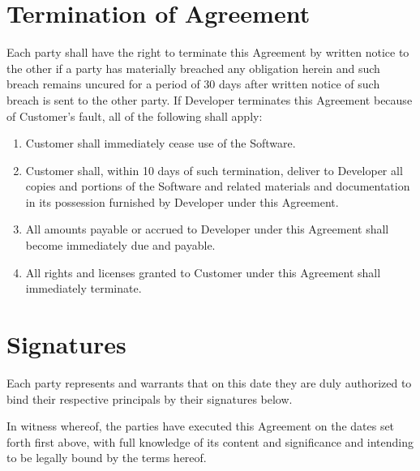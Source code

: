 \documentclass[11pt]{article}
\begin{document}
\section{Termination of Agreement}
Each party shall have the right to terminate this Agreement by written notice to the other if a party has materially breached any obligation herein and such breach remains uncured for a period of 30 days after written notice of such breach is sent to the other party.
If Developer terminates this Agreement because of Customer's fault, all of the following shall apply:
\begin{enumerate} \itemsep0pt \parskip0pt 
\renewcommand{\labelenumi}{(\Alph{enumi})}
\item Customer shall immediately cease use of the Software. 
\item Customer shall, within 10 days of such termination, deliver to Developer all copies and portions of the Software and related materials and documentation in its possession furnished by Developer under this Agreement. 
\item All amounts payable or accrued to Developer under this Agreement shall become immediately due and payable. 
\item All rights and licenses granted to Customer under this Agreement shall immediately terminate. 
\end{enumerate}
\section{Signatures}
Each party represents and warrants that on this date they are duly authorized to bind their respective principals by their signatures below.

In witness whereof, the parties have executed this Agreement on the dates set forth first above, with full knowledge of its content and significance and intending to be legally bound by the terms hereof.

\setlength{\parskip}{20pt} %
\par\noindent{}      \hfill{}%
\setlength{\parskip}{15pt} %
\par\noindent\makebox[2.5in]{\hrulefill} \hfill\makebox[2.5in]{\hrulefill}%
\setlength{\parskip}{0pt} %
\par\noindent{}      \hfill{}%
\setlength{\parskip}{15pt} %
\par\noindent\makebox[2.5in]{\hrulefill} \hfill\makebox[2.5in]{\hrulefill}%
\setlength{\parskip}{0pt} %
\par\noindent{}      \hfill{}%
\end{document}
